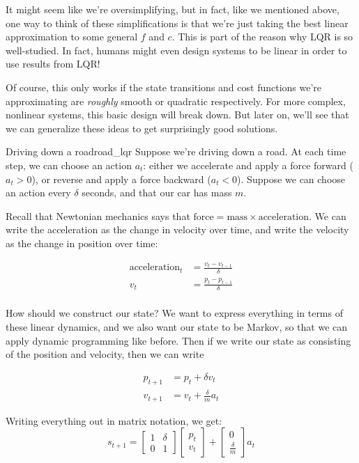 \documentclass[../main/main]{subfiles}
\begin{document}
It might seem like we're oversimplifying, but in fact, like we mentioned above,
one way to think of these simplifications is that we're just taking the best
linear approximation to some general $f$ and $c$. This is part of the reason why
LQR is so well-studied. In fact, humans might even design systems to be linear
in order to use results from LQR!

Of course, this only works if the state transitions and cost functions we're approximating are \emph{roughly} smooth or quadratic respectively. For more complex, nonlinear systems,
this basic design will break down. But later on, we'll see that we can
generalize these ideas to get surprisingly good solutions.

\begin{example}{Driving down a road}{road_lqr}
    Suppose we're driving down a road. At each time step, we can choose an
    action $a_t$: either we accelerate and apply a force forward ($a_t > 0$),
    or reverse and apply a force backward ($a_t < 0$).
    Suppose we can choose an action every $\delta$ seconds, and that our car
    has mass $m$.

    Recall that Newtonian mechanics says that $\text{force} = \text{mass} \times \text{acceleration}$. We can write the acceleration as the change in velocity
    over time, and write the velocity as the change in position over time:

    \begin{align*}
        \text{acceleration}_t &= \frac{v_t - v_{t-1}}{\delta} \\
        v_t &= \frac{p_t - p_{t-1}}{\delta} \\
    \end{align*}

    How should we construct our state? We want to express everything in terms
    of these linear dynamics, and we also want our state to be Markov, so that
    we can apply dynamic programming like before.
    Then if we write our state as consisting of the position and velocity, then
    we can write

    \begin{align*}
        p_{t+1} &= p_t  + \delta v_t \\
        v_{t+1} &= v_t + \frac{\delta}{m} a_t
    \end{align*}

    Writing everything out in matrix notation, we get: \[
        s_{t+1} = \begin{bmatrix}
            1 & \delta \\
            0 & 1
        \end{bmatrix} \begin{bmatrix}
            p_t \\ v_t
        \end{bmatrix}
        +
        \begin{bmatrix}
            0 \\ \frac{\delta}{m}
        \end{bmatrix}
        a_t
    \]
\end{example}
\end{document}
